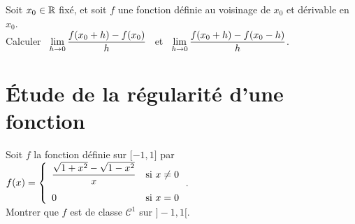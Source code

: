 \documentclass[a4paper, 11pt,reqno]{article}
\begin{document}
\begin{exercice}   \;
	Soit $x_0\in \mathbb{R}$ fix\'e, et soit $f$ une fonction d\'efinie au voisinage de $x_0$ et d\'erivable en $x_0$.\vsec\\
	Calculer \, $\displaystyle\lim\limits_{h \to 0} \frac{f(x_0+h) - f(x_0)}{h}$ \, et \,  $\displaystyle\lim\limits_{h \to 0} \frac{f(x_0+h) - f(x_0-h)}{h}$.
\end{exercice}

\vspace{1cm}

\noindent\section{\large{\'Etude de la r\'egularit\'e d'une fonction}}
\begin{exercice}  \;
	Soit $f$ la fonction d\'efinie sur $\lbrack -1,1\rbrack$ par $f(x)=\left\lbrace \begin{array}{ll}  \ddp\frac{\sqrt{1+x^2}-\sqrt{1-x^2}   }{x} &\hbox{si}\ x\not= 0\vsec\\ 0 & \hbox{si}\ x=0 \end{array}\right.$.\\
	Montrer que $f$ est de classe $\mathcal{C}^1$ sur $\rbrack -1,1\lbrack$.
\end{exercice}
\end{document}
